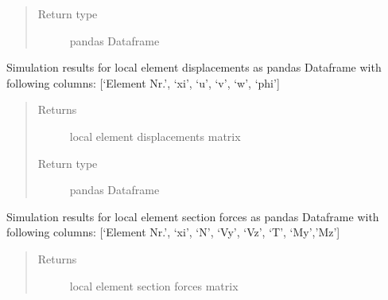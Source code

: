 \documentclass[letterpaper,10pt,english]{sphinxmanual}
\begin{document}
\begin{fulllineitems}
\begin{fulllineitems}
\begin{quote}
\begin{description}
\item[{Return type}] \leavevmode
pandas Dataframe

\end{description}\end{quote}

\end{fulllineitems}


\begin{fulllineitems}
\label{\detokenize{api:beamon.simulation.Simulation.local_element_displacements}}
Simulation results for local element displacements as pandas Dataframe with following columns:
{[}‘Element Nr.’, ‘xi’, ‘u’, ‘v’, ‘w’, ‘phi’{]}
\begin{quote}\begin{description}
\item[{Returns}] \leavevmode
local element displacements matrix

\item[{Return type}] \leavevmode
pandas Dataframe

\end{description}\end{quote}

\end{fulllineitems}


\begin{fulllineitems}
\label{\detokenize{api:beamon.simulation.Simulation.local_element_section_forces}}
Simulation results for local element section forces as pandas Dataframe with following columns:
{[}‘Element Nr.’, ‘xi’, ‘N’, ‘Vy’, ‘Vz’, ‘T’, ‘My’,’Mz’{]}
\begin{quote}\begin{description}
\item[{Returns}] \leavevmode
local element section forces matrix


\end{description}
\end{quote}
\end{fulllineitems}
\end{fulllineitems}
\end{document}
